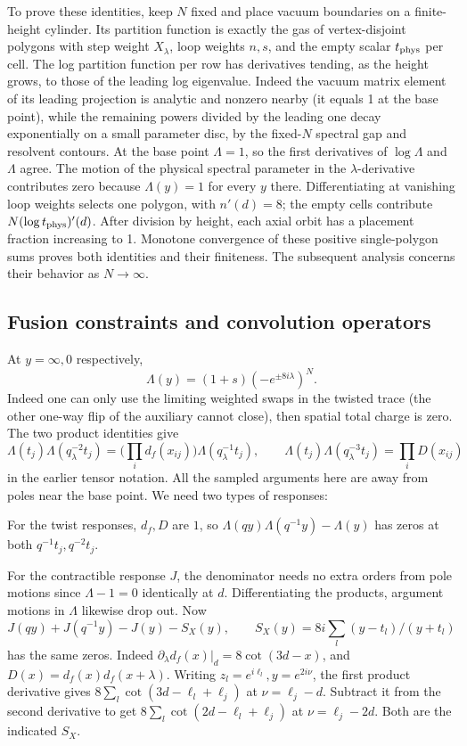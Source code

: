 To prove these identities, keep \(N\) fixed and place vacuum boundaries
on a finite-height cylinder. Its partition function is exactly the gas
of vertex-disjoint polygons with step weight \(X_\lambda\), loop weights
\(n,s\), and the empty scalar \(t_{\rm phys}\) per cell. The log
partition function per row has derivatives tending, as the height grows,
to those of the leading log eigenvalue. Indeed the vacuum matrix element
of its leading projection is analytic and nonzero nearby (it equals 1
at the base point), while the remaining powers divided by the leading
one decay exponentially on a small parameter disc, by the fixed-\(N\)
spectral gap and resolvent contours. At the base point \(\Lambda=1\), so
the first derivatives of \(\log\Lambda\) and \(\Lambda\) agree. The
motion of the physical spectral parameter in the \(\lambda\)-derivative
contributes zero because \(\Lambda(y)=1\) for every \(y\) there.
Differentiating at vanishing loop weights selects one polygon, with
\(n'(d)=8\); the empty cells contribute
\(N(\log t_{\rm phys})'(d)\). After division by height, each axial
orbit has a placement fraction increasing to 1. Monotone convergence of
these positive single-polygon sums proves both identities and their
finiteness. The subsequent analysis concerns their behavior as
\(N\to\infty\).

\subsection{Fusion constraints and convolution operators}

At \(y=\infty,0\) respectively,
\[
             \Lambda(y)=(1+s)(-e^{\pm 8i\lambda})^N.
\]
Indeed one can only use the limiting weighted swaps in the twisted trace (the other one-way flip of the auxiliary cannot close), then spatial total charge is zero. The two product identities give
\[
 \Lambda(t_j)\Lambda(q_\lambda^{-2}t_j)
    =\Big(\prod_i d_f(x_{ij})\Big)\Lambda(q_\lambda^{-1}t_j),\qquad
 \Lambda(t_j)\Lambda(q_\lambda^{-3}t_j)=\prod_i D(x_{ij})
\]
in the earlier tensor notation. All the sampled arguments here are away from poles near the base point. We need two types of responses:
\par\noindent\textbullet\quad For the twist responses, \(d_f,D\) are
\(1\), so \(\Lambda(qy)\Lambda(q^{-1}y)-\Lambda(y)\) has zeros at both
\(q^{-1}t_j,q^{-2}t_j\).
\par\noindent\textbullet\quad For the contractible response \(J\), the denominator needs no extra orders from pole motions since \(\Lambda-1=0\) identically at \(d\). Differentiating the products, argument motions in \(\Lambda\) likewise drop out. Now
\[
          J(qy)+J(q^{-1}y)-J(y)- S_X(y),\qquad
          S_X(y)=8i\sum_l (y-t_l)/(y+t_l)
\]
has the same zeros. Indeed \(\partial_\lambda d_f(x)|_d=8\cot(3d-x)\), and \(D(x)=d_f(x)d_f(x+\lambda)\). Writing \(z_l=e^{i\ell_l}, y=e^{2i\nu}\), the first product derivative gives \(8\sum_l\cot(3d-\ell_l+\ell_j)\) at \(\nu=\ell_j-d\). Subtract it from the second derivative to get \(8\sum_l\cot(2d-\ell_l+\ell_j)\) at \(\nu=\ell_j-2d\). Both are the indicated \(S_X\).

